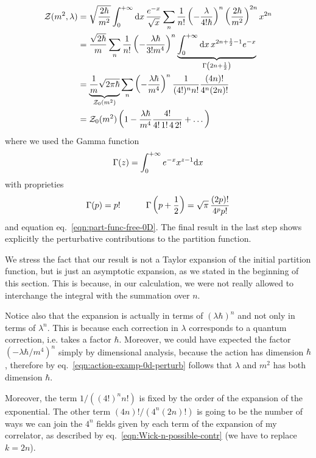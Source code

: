 \documentclass[../main/main.tex]{subfiles}
\begin{document}
\begin{align*}
\mathcal Z(m^2,\lambda)
&=\sqrt{\frac{2\hbar }{m^2}}\int_0^{+\infty}\textup{d} x\,\frac{e^{-x}}{\sqrt x}\sum_n\frac1{n!}\left(-\frac{\lambda}{4!\hbar}\right)^n\left(\frac{2\hbar}{m^2}\right)^{2n}x^{2n}\\
&=\frac{\sqrt{2\hbar}}m\sum_n\frac1{n!}\left(-\frac{\lambda\hbar}{3!m^4}\right)^n\underbrace{\int_0^{+\infty}\textup{d} x\,x^{2n+\frac12-1}e^{-x}}_{\Gamma\left(2n+\frac12\right)}\\
&=\underbrace{\frac1m\sqrt{2\pi\hbar}}_{\mathcal Z_0(m^2)}\sum_n\left(-\frac{\lambda\hbar}{m^4}\right)^n\frac1{(4!)^nn!}\frac{(4n)!}{4^n(2n)!}\\
&=\mathcal Z_0(m^2)\left(1-\frac{\lambda\hbar}{m^4}\frac{4!}{4!\,1!\,4\,2!}+\dots\right)
\end{align*}
where we used the Gamma function
\begin{equation}\label{eqn:Gamma-function}
\Gamma(z)=\int_0^{+\infty}e^{-x}x^{z-1}\textup{d} x
\end{equation}
with proprieties
\[\Gamma(p)=p!\qquad\quad\Gamma\left(p+\frac12\right)=\sqrt\pi\,\frac{(2p)!}{4^pp!}\]
and equation eq.~\eqref{eqn:part-func-free-0D}. The final result in the last step shows explicitly the perturbative contributions to the partition function. 

We stress the fact that our result is not a Taylor expansion of the initial partition function, but is just an asymptotic expansion, as we stated in the beginning of this section. This is because, in our calculation, we were not really allowed to interchange the integral with the summation over $n$. 

Notice also that the expansion is actually in terms of $(\lambda\hbar)^n$ and not only in terms of $\lambda^n$. This is because each correction in $\lambda$ corresponds to a quantum correction, i.e. takes a factor $\hbar$. Moreover, we could have expected the factor $(-\lambda\hbar/m^4)^n$ simply by dimensional analysis, because the action has dimension $\hbar$, therefore by eq.~\eqref{eqn:action-examp-0d-perturb} follows that $\lambda$ and $m^2$ has both dimension $\hbar$.

Moreover, the term $1/((4!)^nn!)$ is fixed by the order of the expansion of the exponential. The other term $(4n)!/(4^n(2n)!)$ is going to be the number of ways we can join the $4^n$ fields given by each term of the expansion of my correlator, as described by eq.~\eqref{eqn:Wick-n-possible-contr} (we have to replace $k=2n$). 
\end{document}
